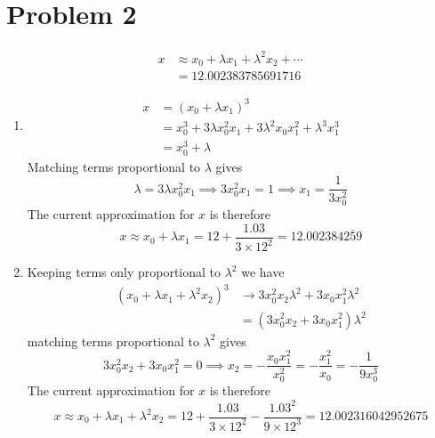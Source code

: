 \documentclass[12pt]{article}
\begin{document}
\section*{Problem 2}
\begin{align*}
    x &\approx x_0 + \lambda x_1 + \lambda^2 x_2 + \cdots\\
    &= 12.002383785691716
\end{align*}  
\begin{enumerate}[label=(\alph*)]
    \item 
    \begin{align*}
        x &= (x_0 + \lambda x_1)^3 \\
        &= x_0^3 + 3\lambda x_0^2x_1 + 3\lambda^2x_0x_1^2 + \lambda^3 x_1^3 \\
        &= x_0^3 + \lambda
    \end{align*}
    Matching terms proportional to $\lambda$ gives
    \[ \lambda = 3\lambda x_0^2x_1 \implies 3x_0^2x_1 = 1 \implies x_1 = \frac{1}{3x_0^2} \]
    The current approximation for $x$ is therefore
    \[ x \approx x_0 + \lambda x_1 = 12 + \frac{1.03}{3\times12^2} = 12.002384\overline{259} \]

    \item Keeping terms only proportional to $\lambda^2$ we have
    \begin{align*}
        (x_0 + \lambda x_1 + \lambda^2 x_2)^3 &\to 3x_0^2x_2\lambda^2 + 3x_0x_1^2\lambda^2 \\
        &= (3x_0^2x_2 + 3x_0x_1^2) \lambda^2
    \end{align*}
    matching terms proportional to $\lambda^2$ gives
    \[ 3x_0^2x_2 + 3x_0x_1^2 = 0 \implies x_2 = -\frac{x_0x_1^2}{x_0^2} = -\frac{x_1^2}{x_0} = -\frac{1}{9x_0^3} \]
    The current approximation for $x$ is therefore
    \[ x \approx x_0 + \lambda x_1 + \lambda^2 x_2 = 12 + \frac{1.03}{3\times12^2} - \frac{1.03^2}{9\times12^3} = 12.002316042952675\]
\end{enumerate}
\end{document}
